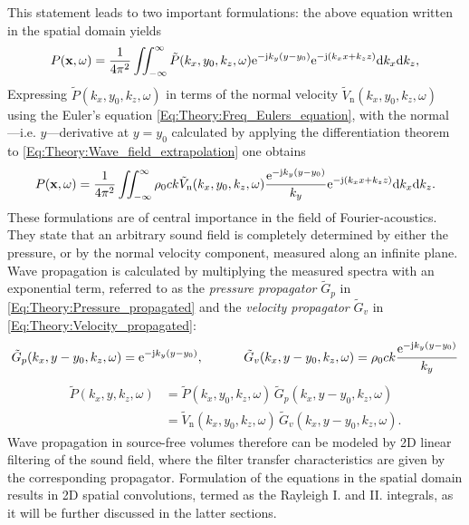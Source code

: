 \vspace{3mm}
This statement leads to two important formulations:
the above equation written in the spatial domain yields
\begin{equation}
P(\mathbf{x},\omega) = \frac{1}{4\pi^2}\iint_{-\infty}^{\infty} \tilde{P}(k_x,y_0,k_z,\omega) \mathrm{e}^{-\mathrm{j} k_y ( y - y_0 ) }  \mathrm{e}^{- \mathrm{j} \left( k_x x  + k_z z \right) }
\mathrm{d} k_x\mathrm{d} k_z,
\label{Eq:Theory:Pressure_propagated}
\end{equation}
Expressing $\tilde{P}(k_x,y_0,k_z,\omega)$ in terms of the normal velocity $\tilde{V}_{\mathrm{n}}(k_x,y_0,k_z,\omega)$ using the Euler's equation  \eqref{Eq:Theory:Freq_Eulers_equation}, with the normal ---i.e. $y$---derivative at $y = y_0$ calculated by applying the differentiation theorem to \eqref{Eq:Theory:Wave_field_extrapolation} one obtains
\begin{equation}
P(\mathbf{x},\omega) = \frac{1}{4\pi^2}\iint_{-\infty}^{\infty} \rho_0 c k \tilde{V}_{\mathrm{n}}(k_x,y_0,k_z,\omega) \frac{\mathrm{e}^{-\mathrm{j} k_y ( y - y_0 ) } }{k_y} \mathrm{e}^{- \mathrm{j} \left( k_x x + k_z z \right) }
\mathrm{d} k_x\mathrm{d} k_z.
\label{Eq:Theory:Velocity_propagated}
\end{equation}
These formulations are of central importance in the field of Fourier-acoustics. 
They state that an arbitrary sound field is completely determined by either the pressure, or by the normal velocity component, measured along an infinite plane. 
Wave propagation is calculated by multiplying the measured spectra with an exponential term, referred to as the \emph{pressure propagator} $\tilde{G}_p$ in \eqref{Eq:Theory:Pressure_propagated} and the \emph{velocity propagator} $\tilde{G}_v$ in \eqref{Eq:Theory:Velocity_propagated}:
\begin{equation}
\tilde{G}_p(k_x,y-y_0,k_z,\omega) = \mathrm{e}^{-\mathrm{j} k_y ( y - y_0 ) } ,\ \hspace{1cm}
\tilde{G}_v(k_x,y-y_0,k_z,\omega) = \rho_0 c k \frac{\mathrm{e}^{-\mathrm{j} k_y ( y - y_0 ) } }{k_y}
\label{Eq:Theory:propagators}
\end{equation}
\begin{align}
\tilde{P}(k_x,y,k_z,\omega) &= \tilde{P}(k_x,y_0,k_z,\omega) \, \tilde{G}_p(k_x,y-y_0,k_z,\omega) \\
                            &= \tilde{V}_{\mathrm{n}}(k_x,y_0,k_z,\omega) \, \tilde{G}_v(k_x,y-y_0,k_z,\omega).
\end{align}
Wave propagation in source-free volumes therefore can be modeled by 2D linear filtering of the sound field, where the filter transfer characteristics are given by the corresponding propagator.
Formulation of the equations in the spatial domain results in 2D spatial convolutions, termed as the Rayleigh I. and II. integrals, as it will be further discussed in the latter sections.

